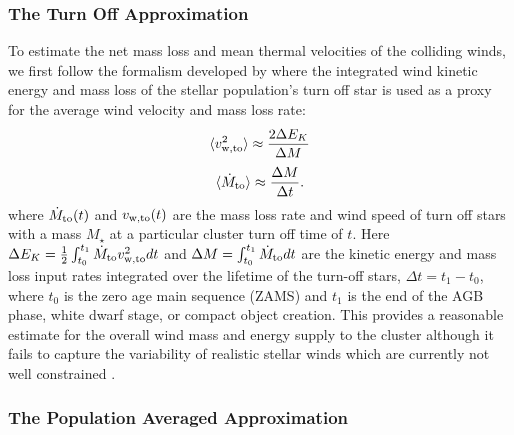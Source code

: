 \documentclass[fleqn,usenatbib]{mnras}
\begin{document}
\subsubsection{The Turn Off Approximation} \label{section:to}

To estimate the net mass loss and mean thermal velocities of the colliding winds,  we first follow the formalism developed by \cite{pooley2006} where the integrated wind kinetic energy and mass loss  of the stellar population's turn off star is used 
as  a proxy for the average wind velocity and mass loss rate:
\begin{equation}
\langle v_{\rm w, to}^2\rangle \approx {2\Delta E_K \over \Delta M}
\label{eq:vto}
\end{equation}
\begin{equation}
\langle \dot{M}_{\rm to} \rangle \approx {\Delta M \over \Delta t}.
\label{eq:mdotto}
\end{equation}
where $\dot{M}_{\rm to}(t)$ and $v_{\rm w, to}(t)$ are the mass loss rate and wind speed of turn off stars with a mass $M_\star$ at a particular cluster turn off time of $t$.
Here $\Delta E_K =  \frac{1}{2} \int_{t_0}^{t_1}\dot{M}_{\rm to} v_{\rm w, to}^2 dt$ and $\Delta M = \int_{t_0}^{t_1} \dot{M}_{\rm to} dt$ 
are the kinetic energy and mass loss input rates integrated over the lifetime  of the turn-off stars, 
$\Delta t = t_1 - t_0$, where $t_0$ is the zero age main sequence (ZAMS) and $t_1$ is the end of the AGB phase, white dwarf stage, or compact object creation.  This  provides a reasonable estimate for the overall wind mass and energy supply to the cluster although it fails to capture the variability of realistic stellar winds which are currently not well constrained \citep{marigo2012,wood2005,cohen2011}.
 
\subsubsection{The Population Averaged Approximation} \label{section:pa}
 
\end{document}
